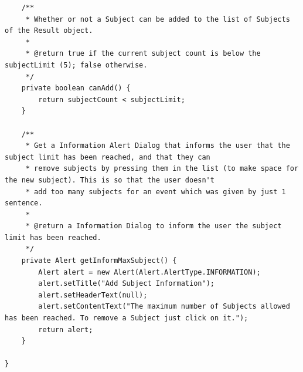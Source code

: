 \begin{lstlisting}
    /**
     * Whether or not a Subject can be added to the list of Subjects of the Result object.
     *
     * @return true if the current subject count is below the subjectLimit (5); false otherwise.
     */
    private boolean canAdd() {
        return subjectCount < subjectLimit;
    }

    /**
     * Get a Information Alert Dialog that informs the user that the subject limit has been reached, and that they can
     * remove subjects by pressing them in the list (to make space for the new subject). This is so that the user doesn't
     * add too many subjects for an event which was given by just 1 sentence.
     *
     * @return a Information Dialog to inform the user the subject limit has been reached.
     */
    private Alert getInformMaxSubject() {
        Alert alert = new Alert(Alert.AlertType.INFORMATION);
        alert.setTitle("Add Subject Information");
        alert.setHeaderText(null);
        alert.setContentText("The maximum number of Subjects allowed has been reached. To remove a Subject just click on it.");
        return alert;
    }

}
\end{lstlisting}
